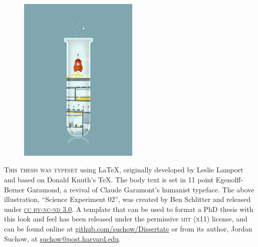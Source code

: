 \newpage

\begin{figure}
  \vspace{50pt}
  \centering
    \includegraphics[width=0.51\textwidth]{dissertation/endmatter/colophon.png}
\end{figure}


\begin{center}
\parbox{200pt}{\lettrine[lines=3,slope=-2pt,nindent=-4pt]{\textcolor{SchoolColor}{T}}{his thesis was typeset} using \LaTeX, originally developed by Leslie Lamport and based on Donald Knuth's \TeX. The body text is set in 11 point Egenolff-Berner Garamond, a revival of Claude Garamont's humanist typeface. The above illustration, ``Science Experiment 02'', was created by Ben Schlitter and released under \href{http://creativecommons.org/licenses/by-nc-nd/3.0/}{\textsc{cc by-nc-nd 3.0}}. A template that can be used to format a PhD thesis with this look and feel has been released under the permissive \textsc{mit} (\textsc{x}11) license, and can be found online at \href{https://github.com/suchow/Dissertate}{github.com/suchow/Dissertate} or from its author, Jordan Suchow, at \href{mailto:suchow@post.harvard.edu}{suchow@post.harvard.edu}.}
\end{center}
